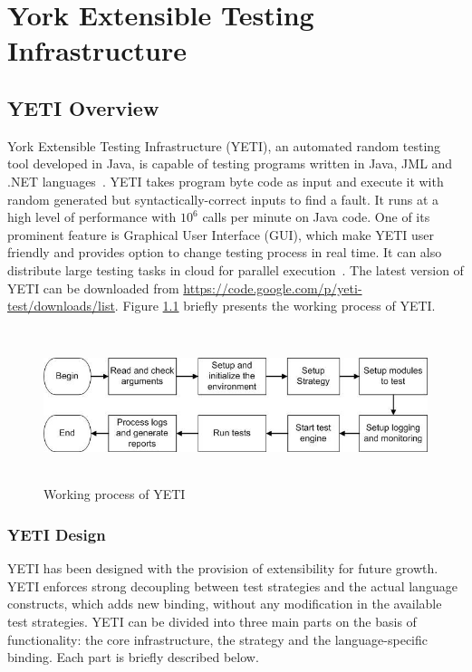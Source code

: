 
\chapter{York Extensible Testing Infrastructure}
\label{chap:yeti_3}




\section{YETI Overview}
York Extensible Testing Infrastructure (YETI), an automated random testing tool developed in Java, is capable of testing programs written in Java, JML and .NET languages~\cite{Oriol2010c}. YETI takes program byte code as input and execute it with random generated but syntactically-correct inputs to find a fault. It runs at a high level of performance with $10^6$ calls per minute on Java code. One of its prominent feature is Graphical User Interface (GUI), which make YETI user friendly and provides option to change testing process in real time. It can also distribute large testing tasks in cloud for parallel execution~\cite{Oriol2010}. The latest version of YETI can be downloaded from \url{https://code.google.com/p/yeti-test/downloads/list}. Figure \ref{fig:yetiOverview} briefly presents the working process of YETI. 
\begin{figure}[h]
	\centering
	\includegraphics[width=15cm, height=4.5cm]{chapter3/yetiOverview.png}
	\caption{Working process of YETI}
	\label{fig:yetiOverview}
\end{figure}


\subsection{YETI Design}
YETI has been designed with the provision of extensibility for future growth. YETI enforces strong decoupling between test strategies and the actual language constructs, which adds new binding, without any modification in the available test strategies. YETI can be divided into three main parts on the basis of functionality: the core infrastructure, the strategy and the language-specific binding. Each part is briefly described below. 

